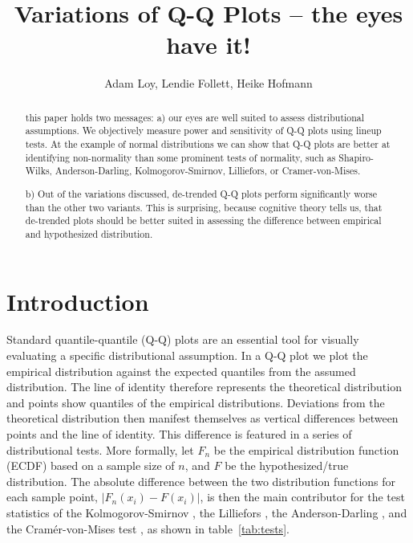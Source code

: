 \documentclass{article}\usepackage[]{graphicx}\usepackage[]{color}
\title{Variations of Q-Q Plots -- the eyes have it!}
\author{Adam Loy, Lendie Follett, Heike Hofmann}
\begin{document}
\maketitle
\begin{abstract}
this paper holds two messages: 
a) our eyes are well suited to assess distributional assumptions. We  objectively measure  power and sensitivity of Q-Q plots using lineup tests. 
At the example of normal distributions we can show that Q-Q plots are better at identifying non-normality than some prominent tests of normality, such as Shapiro-Wilks,  Anderson-Darling,  Kolmogorov-Smirnov, Lilliefors, or  Cramer-von-Mises.

b) Out of the variations discussed, de-trended Q-Q plots perform significantly worse than the other two variants. This is surprising, because cognitive theory tells us, that de-trended plots should be better suited in assessing the difference between empirical and hypothesized  distribution.
\end{abstract}











\section{Introduction}

Standard quantile-quantile (Q-Q) plots \citep{Wilk:1968} are an essential tool for  visually evaluating a specific distributional assumption. In a Q-Q plot we plot the empirical distribution against the expected quantiles from the assumed distribution. The line of identity therefore represents the theoretical distribution and points show quantiles of the empirical distributions. Deviations from the theoretical distribution then manifest themselves as vertical differences between points and the line of identity. This difference is featured in a series of distributional tests. More formally, let $F_n$ be the empirical distribution function (ECDF) based on a sample size of $n$, and $F$ be the hypothesized/true distribution. The absolute difference between the two distribution functions for each sample point, $\left| F_n(x_i) - F(x_i) \right|$, is then the main contributor for the test statistics of the Kolmogorov-Smirnov \cite[KS-test,][]{kolmogorov:1933, smirnov:1948}, the Lilliefors \cite[LF-test, ][]{lilliefors}, the Anderson-Darling \citep[AD-test,][]{adtest:1954}, and the Cram\'{e}r-von-Mises test \citep[CVM-test,][]{cramer:1928, mises:1928}, as shown in table~\ref{tab:tests}.
\end{document}
